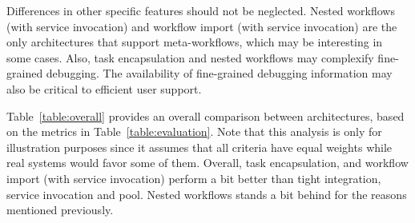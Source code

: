 \documentclass[preprint,3p,twocolumn]{elsarticle}
\newcommand{\note}[2]{\pdfmargincomment[color=yellow,author=#1,open=true]{#2}}
\newcommand{\closednote}[4]{} %
\begin{document}
Differences in other specific features should not be neglected. Nested
workflows (with service invocation) and workflow import (with service
invocation) are the only architectures that support meta-workflows,
which may be interesting in some cases. Also, task encapsulation and nested
workflows may complexify fine-grained debugging. \closednote{Rafael}{I would
  suggest to provide some more examples when this could be
  interesting.}{Tristan}{Done.}  The availability of fine-grained debugging
information may also be critical to efficient user support.

Table~\ref{table:overall} provides an overall comparison between
architectures, based on the metrics in Table~\ref{table:evaluation}.
Note that this analysis is only for illustration purposes since it
assumes that all criteria have equal weights while real systems would
favor some of them. Overall, task encapsulation, and workflow import (with
service invocation) perform a bit better than tight integration,
service invocation and pool. Nested workflows stands a bit behind for
the reasons mentioned previously.\closednote{Rafael}{I would emphasize
  that this analysis is only for illustration purposes, since it does
  not account for different weights in metrics.}{Tristan}{Done.}
\end{document}
